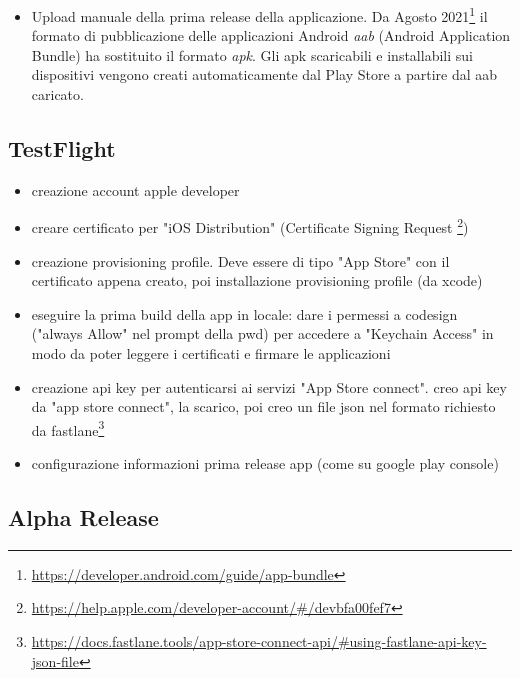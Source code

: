 \begin{itemize}
\begin{itemize}
        \begin{listing}[H]
        \inputminted{bash}{code/4-jks}
        \caption{Creazione, codifica e decodifica della chiave JKS}
        \end{listing}
    \end{itemize}
    \item Upload manuale della prima release della applicazione. Da Agosto 2021\footnote{\url{https://developer.android.com/guide/app-bundle}} il formato di pubblicazione delle applicazioni Android \textit{aab} (Android Application Bundle) ha sostituito il formato \textit{apk}. Gli apk scaricabili e installabili sui dispositivi vengono creati automaticamente dal Play Store a partire dal aab caricato.
\end{itemize}

\subsection{TestFlight}
\begin{itemize}
    \item creazione account apple developer
    \item creare certificato per "iOS Distribution" (Certificate Signing Request \footnote{\url{https://help.apple.com/developer-account/\#/devbfa00fef7}})
    \item creazione provisioning profile. Deve essere di tipo "App Store" con il certificato appena creato, poi installazione provisioning profile (da xcode)
    \item eseguire la prima build della app in locale: dare i permessi a codesign ("always Allow" nel prompt della pwd) per accedere a "Keychain Access" in modo da poter leggere i certificati e firmare le applicazioni
    \item creazione api key per autenticarsi ai servizi "App Store connect". creo api key da "app store connect", la scarico, poi creo un file json nel formato richiesto da fastlane\footnote{\url{https://docs.fastlane.tools/app-store-connect-api/\#using-fastlane-api-key-json-file}}
    \item configurazione informazioni prima release app (come su google play console)
\end{itemize}

\subsection{Alpha Release}

